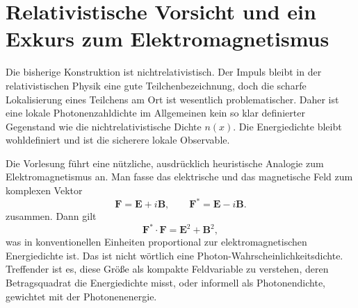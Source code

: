 \section{Relativistische Vorsicht und ein Exkurs zum Elektromagnetismus}

Die bisherige Konstruktion ist nichtrelativistisch. Der Impuls bleibt in der relativistischen Physik eine gute Teilchenbezeichnung, doch die scharfe Lokalisierung eines Teilchens am Ort ist wesentlich problematischer. Daher ist eine lokale Photonenzahldichte im Allgemeinen kein so klar definierter Gegenstand wie die nichtrelativistische Dichte \(n(x)\). Die Energiedichte bleibt wohldefiniert und ist die sicherere lokale Observable.

Die Vorlesung führt eine nützliche, ausdrücklich heuristische Analogie zum Elektromagnetismus an. Man fasse das elektrische und das magnetische Feld zum komplexen Vektor
\begin{equation}
\mathbf F=\mathbf E+i\mathbf B,
\qquad
\mathbf F^*=\mathbf E-i\mathbf B.
\label{eq:l07-riemann-silberstein}
\end{equation}
zusammen. Dann gilt
\begin{equation}
\mathbf F^*\mathbin{\cdot}\mathbf F
=\mathbf E^2+\mathbf B^2,
\label{eq:l07-em-density}
\end{equation}
was in konventionellen Einheiten proportional zur elektromagnetischen Energiedichte ist. Das ist nicht wörtlich eine Photon-Wahrscheinlichkeitsdichte. Treffender ist es, diese Größe als kompakte Feldvariable zu verstehen, deren Betragsquadrat die Energiedichte misst, oder informell als Photonendichte, gewichtet mit der Photonenenergie.

\begin{classroomqa}
\end{classroomqa}

\begin{classroomqa}
\end{classroomqa}

